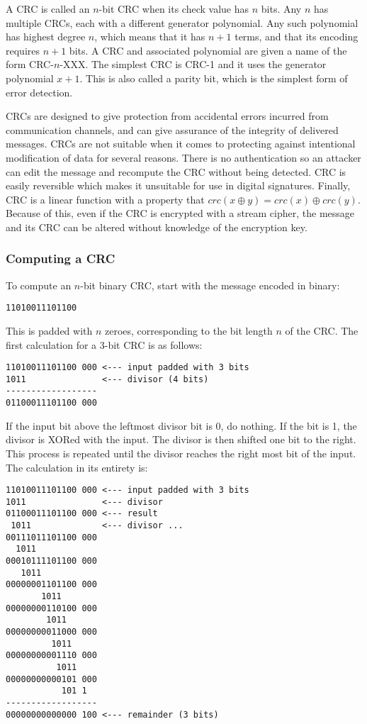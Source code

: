 \documentclass{article}
\begin{document}
A CRC is called an $n$-bit CRC when its check value has $n$ bits. Any $n$ has multiple CRCs, each with a different generator polynomial.
Any such polynomial has highest degree $n$, which means that it has $n + 1$ terms, and that its encoding requires $n + 1$ bits.
A CRC and associated polynomial are given a name of the form CRC-$n$-XXX. The simplest CRC is CRC-1 and it uses the generator
polynomial $x + 1$. This is also called a parity bit, which is the simplest form of error detection.

CRCs are designed to give protection from accidental errors incurred from communication channels, and can give assurance of the integrity of 
delivered messages. CRCs are not suitable when it comes to protecting against intentional modification of data for several reasons. 
There is no authentication so an attacker can edit the message and recompute the CRC without being detected. CRC is easily reversible
which makes it unsuitable for use in digital signatures. Finally, CRC is a linear function with a property that $crc(x \oplus y) =
crc(x) \oplus crc(y)$. Because of this, even if the CRC is encrypted with a stream cipher, the message and its CRC can be altered
without knowledge of the encryption key. 

\subsubsection{Computing a CRC}

To compute an $n$-bit binary CRC, start with the message encoded in binary:
\begin{verbatim}
11010011101100
\end{verbatim}
This is padded with $n$ zeroes, corresponding to the bit length $n$ of the CRC. The first calculation for a 3-bit CRC is as follows:
\begin{verbatim}
11010011101100 000 <--- input padded with 3 bits
1011               <--- divisor (4 bits) 
------------------
01100011101100 000
\end{verbatim}
If the input bit above the leftmost divisor bit is 0, do nothing. If the bit is 1, the divisor is XORed with the input. The divisor is
then shifted one bit to the right. This process is repeated until the divisor reaches the right most bit of the input. The calculation
in its entirety is:
\begin{verbatim}
11010011101100 000 <--- input padded with 3 bits
1011               <--- divisor
01100011101100 000 <--- result
 1011              <--- divisor ...
00111011101100 000
  1011
00010111101100 000
   1011
00000001101100 000
       1011
00000000110100 000
        1011
00000000011000 000
         1011
00000000001110 000
          1011
00000000000101 000
           101 1
------------------
00000000000000 100 <--- remainder (3 bits)
\end{verbatim}
\end{document}
